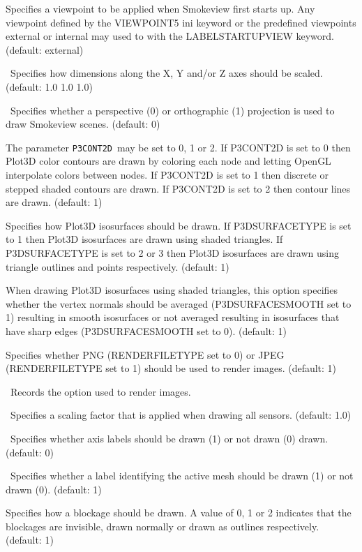 \documentclass[11pt,twoside]{book}
\newcommand{\hitem}[1]{\item[{\bf #1} \hfill]}
\begin{document}
\hitem{LABELSTARTUPVIEW}Specifies a viewpoint to be applied when Smokeview first starts up.
Any viewpoint defined by the VIEWPOINT5 ini keyword or the predefined viewpoints external or internal may used to with the LABELSTARTUPVIEW keyword.
(default: external)

\hitem{MSCALE}\ Specifies how dimensions along the X, Y
and/or Z axes should be scaled. (default: 1.0 1.0 1.0)

\hitem{PROJECTION}\ Specifies whether a perspective (0) or orthographic (1) projection
is used to draw Smokeview scenes.
(default: 0)

\hitem{P3CONT2D}The parameter {\tt P3CONT2D}\ may be set to 0, 1 or
2.  If P3CONT2D is set to 0 then Plot3D color contours are drawn
by coloring each node and letting OpenGL interpolate colors
between nodes.  If P3CONT2D is set to 1 then discrete or stepped
shaded contours are drawn.  If P3CONT2D is set to 2 then contour
lines are drawn. (default: 1)

\hitem{P3DSURFACETYPE}Specifies how Plot3D isosurfaces should be
drawn.  If P3DSURFACETYPE is set to 1 then Plot3D isosurfaces are
drawn using shaded triangles.  If P3DSURFACETYPE is set to 2 or 3
then Plot3D isosurfaces are drawn using triangle outlines and
points respectively. (default: 1)

\hitem{P3DSURFACESMOOTH}When drawing Plot3D isosurfaces using
shaded triangles, this option specifies whether the vertex normals
should be averaged (P3DSURFACESMOOTH set to 1) resulting in smooth
isosurfaces or not averaged resulting in isosurfaces that have
sharp edges (P3DSURFACESMOOTH set to 0). (default: 1)

\hitem{RENDERFILETYPE}Specifies whether PNG (RENDERFILETYPE set to 0) or
JPEG (RENDERFILETYPE set to 1)
should be used to render images.  (default: 1)

\hitem{RENDEROPTION}\ Records the option used to render images.

\hitem{SENSORRELSIZE}\ Specifies a scaling factor that is applied when
drawing all sensors.  (default: 1.0)

\hitem{SHOWAXISLABELS}\ Specifies whether axis labels should
be drawn (1) or not drawn (0) drawn. (default: 0)

\hitem{SHOWBLOCKLABEL}\ Specifies whether a label identifying the
active mesh should be drawn (1) or not drawn (0). (default: 1)

\hitem{SHOWBLOCKS}Specifies how a blockage should
be drawn.  A value of 0, 1 or 2 indicates that the blockages are
invisible, drawn normally or drawn as outlines respectively.  (default: 1)
\end{document}
